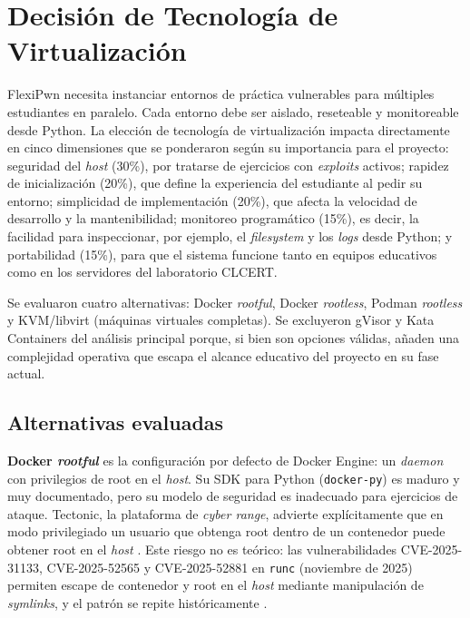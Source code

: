 \section{Decisión de Tecnología de Virtualización}
\label{sec:virtualizacion}

FlexiPwn necesita instanciar entornos de práctica vulnerables para múltiples
estudiantes en paralelo. Cada entorno debe ser aislado, reseteable y
monitoreable desde Python. La elección de tecnología de virtualización impacta
directamente en cinco dimensiones que se ponderaron según su importancia para el
proyecto: seguridad del \textit{host} (30\%), por tratarse de ejercicios con
\textit{exploits} activos; rapidez de inicialización (20\%), que define la
experiencia del estudiante al pedir su entorno; simplicidad de implementación
(20\%), que afecta la velocidad de desarrollo y la mantenibilidad; monitoreo
programático (15\%), es decir, la facilidad para inspeccionar, por ejemplo, el
\textit{filesystem} y los \textit{logs} desde Python; y portabilidad (15\%),
para que el sistema funcione tanto en equipos educativos como en los servidores
del laboratorio CLCERT.

Se evaluaron cuatro alternativas: Docker \textit{rootful}, Docker
\textit{rootless}, Podman \textit{rootless} y KVM/libvirt (máquinas virtuales
completas). Se excluyeron gVisor y Kata Containers del análisis principal
porque, si bien son opciones válidas, añaden una complejidad operativa que
escapa el alcance educativo del proyecto en su fase actual.

\subsection{Alternativas evaluadas}

\textbf{Docker \textit{rootful}} es la configuración por defecto de Docker
Engine: un \textit{daemon} con privilegios de root en el \textit{host}. Su SDK
para Python (\texttt{docker-py}) es maduro y muy documentado, pero su modelo de
seguridad es inadecuado para ejercicios de ataque. Tectonic, la plataforma de
\textit{cyber range}, advierte explícitamente que en modo privilegiado un
usuario que obtenga root dentro de un contenedor puede obtener root en el
\textit{host} \cite{tectonic}. Este riesgo no es teórico: las vulnerabilidades
CVE-2025-31133, CVE-2025-52565 y CVE-2025-52881 en \texttt{runc} (noviembre de
2025) permiten escape de contenedor y root en el \textit{host} mediante
manipulación de \textit{symlinks}, y el patrón se repite históricamente
\cite{cve-runc-2025}.

